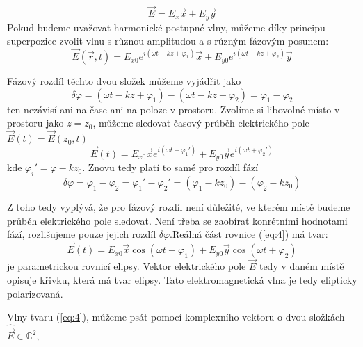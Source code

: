 \documentclass[a4paper]{article}
\numberwithin{equation}{section}
\begin{document}
    \begin{equation} \label{eq:1}
        \vec{E} = E_x\vec{x} + E_y\vec{y}
    \end{equation}
    Pokud budeme uvažovat harmonické postupné vlny, můžeme díky principu superpozice zvolit vlnu s různou amplitudou a s různým fázovým posunem:
    \begin{equation} \label{eq:2}
        \vec{E}(\vec{r},t) = E_{x0} e^{i(\omega t - kz + \varphi_1)} \vec{x} + 
                             E_{y0} e^{i(\omega t - kz + \varphi_2)} \vec{y}
    \end{equation}
    \par Fázový rozdíl těchto dvou složek můžeme vyjádřit jako 
    \begin{equation} \label{eq:3}
        \delta \varphi = (\omega t -kz + \varphi_1) - (\omega t -kz + \varphi_2) = \varphi_1 - \varphi_2
    \end{equation}
    ten nezávisí ani na čase ani na poloze v prostoru. Zvolíme si libovolné místo v prostoru jako $z = z_0$, můžeme sledovat časový průběh elektrického pole $\vec{E}(t) = \vec{E}(z_0,t)$
    \begin{equation} \label{eq:4}
        \vec{E}(t) = E_{x0} \vec{x} e^{i(\omega t + \varphi_1')} + E_{y0} \vec{y} e^{i(\omega t + \varphi_2')}
    \end{equation}
    kde $\varphi_i' = \varphi - kz_0$. Znovu tedy platí to samé pro rozdíl fází
    \begin{equation} \label{eq:5}
        \delta \varphi = \varphi_1 - \varphi_2 = \varphi_1' - \varphi_2' = (\varphi_1 - kz_0) - (\varphi_2 - kz_0)
    \end{equation}
    \par Z toho tedy vyplývá, že pro fázový rozdíl není důležité, ve kterém místě budeme průběh elektrického pole sledovat. Není třeba se zaobírat konrétními hodnotami fází, rozlišujeme pouze jejich rozdíl $\delta \varphi$.Reálná část rovnice (\ref{eq:4}) má tvar:
    \begin{equation} \label{eq:6}
        \vec{E}(t) = E_{x0}\vec{x}\cos(\omega t + \varphi_1) + E_{y0}\vec{y}\cos(\omega t + \varphi_2)
    \end{equation}
    je parametrickou rovnicí elipsy. Vektor elektrického pole $\vec{E}$ tedy v daném místě opisuje křivku, která má tvar elipsy. Tato elektromagnetická vlna je tedy elipticky polarizovaná. 
    \par Vlny tvaru (\ref{eq:4}), můžeme psát pomocí komplexního vektoru o dvou složkách $\hat{\vec{E}} \in \mathbb{C}^2$, 
\end{document}
